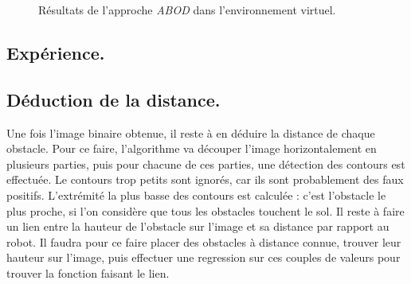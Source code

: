 \begin{figure}
\begin{center}
\begin{tabular}{cc}
        \end{tabular}
    \end{center}
    \caption{Résultats de l'approche \emph{ABOD} dans l'environnement virtuel.}
    \label{abod_simu}
\end{figure}

\subsection{Expérience.}

\subsection{Déduction de la distance.}
Une fois l'image binaire obtenue, il reste à en déduire la distance de chaque obstacle. Pour ce faire, l'algorithme va découper l'image horizontalement en plusieurs parties, puis pour chacune de ces parties, une détection des contours est effectuée. Le contours trop petits sont ignorés, car ils sont probablement des faux positifs. L'extrémité la plus basse des contours est calculée : c'est l'obstacle le plus proche, si l'on considère que tous les obstacles touchent le sol. Il reste à faire un lien entre la hauteur de l'obstacle sur l'image et sa distance par rapport au robot. Il faudra pour ce faire placer des obstacles à distance connue, trouver leur hauteur sur l'image, puis effectuer une regression sur ces couples de valeurs pour trouver la fonction faisant le lien.


